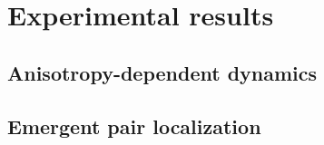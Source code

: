 \chapter{Experimental results}
\section{Anisotropy-dependent dynamics}

\section{Emergent pair localization}